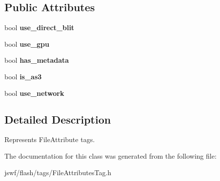 \subsection*{Public Attributes}
\begin{DoxyCompactItemize}
\item 
\hypertarget{classjswf_1_1flash_1_1tags_1_1_file_attributes_tag_aa8b22f78f188684d9595d81db2fcfa0e}{bool {\bfseries use\+\_\+direct\+\_\+blit}}\label{classjswf_1_1flash_1_1tags_1_1_file_attributes_tag_aa8b22f78f188684d9595d81db2fcfa0e}

\item 
\hypertarget{classjswf_1_1flash_1_1tags_1_1_file_attributes_tag_aaadbf26d1d9c16e62048be7412839995}{bool {\bfseries use\+\_\+gpu}}\label{classjswf_1_1flash_1_1tags_1_1_file_attributes_tag_aaadbf26d1d9c16e62048be7412839995}

\item 
\hypertarget{classjswf_1_1flash_1_1tags_1_1_file_attributes_tag_afef5a090ce260e125c3b8c309928a11b}{bool {\bfseries has\+\_\+metadata}}\label{classjswf_1_1flash_1_1tags_1_1_file_attributes_tag_afef5a090ce260e125c3b8c309928a11b}

\item 
\hypertarget{classjswf_1_1flash_1_1tags_1_1_file_attributes_tag_acb853599995dec39a858e1905589662d}{bool {\bfseries is\+\_\+as3}}\label{classjswf_1_1flash_1_1tags_1_1_file_attributes_tag_acb853599995dec39a858e1905589662d}

\item 
\hypertarget{classjswf_1_1flash_1_1tags_1_1_file_attributes_tag_a6590aafd6d48cfae7693e4ff0ee06027}{bool {\bfseries use\+\_\+network}}\label{classjswf_1_1flash_1_1tags_1_1_file_attributes_tag_a6590aafd6d48cfae7693e4ff0ee06027}

\end{DoxyCompactItemize}


\subsection{Detailed Description}
Represents {\ttfamily File\+Attribute} tags. 

The documentation for this class was generated from the following file\+:\begin{DoxyCompactItemize}
\item 
jswf/flash/tags/File\+Attributes\+Tag.\+h\end{DoxyCompactItemize}
